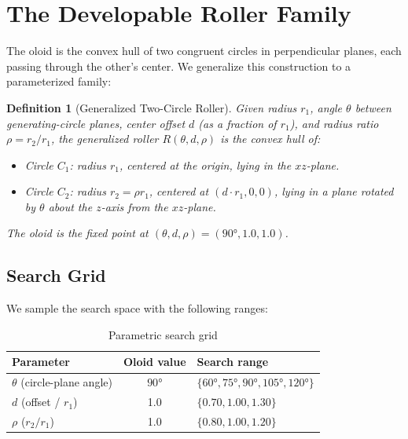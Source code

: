 \documentclass[11pt,a4paper]{article}
\newtheorem{definition}{Definition}
\begin{document}

\section{The Developable Roller Family}

The oloid is the convex hull of two congruent circles in perpendicular
planes, each passing through the other's center. We generalize this
construction to a parameterized family:

\begin{definition}[Generalized Two-Circle Roller]
Given radius $r_1$, angle $\theta$ between generating-circle planes,
center offset $d$ (as a fraction of $r_1$), and radius ratio
$\rho = r_2/r_1$, the generalized roller $R(\theta, d, \rho)$ is the
convex hull of:
\begin{itemize}[leftmargin=*]
  \item Circle $C_1$: radius $r_1$, centered at the origin, lying in
    the $xz$-plane.
  \item Circle $C_2$: radius $r_2 = \rho r_1$, centered at
    $(d \cdot r_1, 0, 0)$, lying in a plane rotated by $\theta$ about
    the $z$-axis from the $xz$-plane.
\end{itemize}
The oloid is the fixed point at
$(\theta, d, \rho) = (90°, 1.0, 1.0)$.
\end{definition}

\subsection{Search Grid}

We sample the search space with the following ranges:

\begin{table}[h]
\centering
\caption{Parametric search grid}
\label{tab:search-grid}
\begin{tabular}{lcl}
\toprule
Parameter & Oloid value & Search range \\
\midrule
$\theta$ (circle-plane angle) & $90°$ & $\{60°, 75°, 90°, 105°, 120°\}$ \\
$d$ (offset / $r_1$) & 1.0 & $\{0.70, 1.00, 1.30\}$ \\
$\rho$ ($r_2 / r_1$) & 1.0 & $\{0.80, 1.00, 1.20\}$ \\
\bottomrule
\end{tabular}
\end{table}
\end{document}

